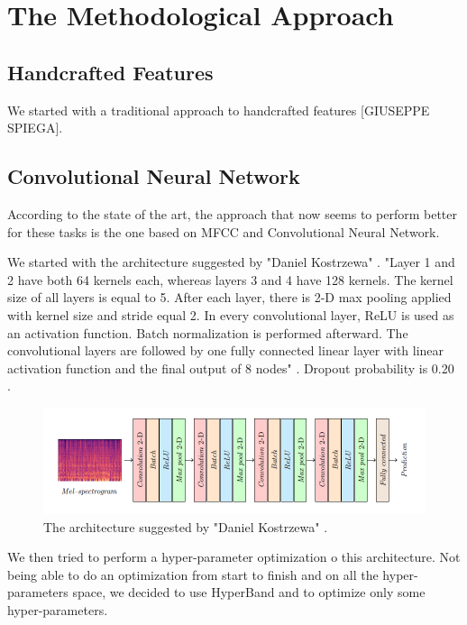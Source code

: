 \section{The Methodological Approach}

\subsection{Handcrafted Features}
We started with a traditional approach to handcrafted features [GIUSEPPE SPIEGA].

\subsection{Convolutional Neural Network}
According to the state of the art, the approach that now seems to perform better for these tasks is the one based on MFCC and Convolutional Neural Network. 

We started with the architecture suggested by "Daniel Kostrzewa" \cite{kostrzewa2021music}.
"Layer 1 and 2 have both 64 kernels each, whereas layers 3 and 4 have 128 kernels. The kernel size of all layers is equal to 5. After each layer, there is 2-D max pooling applied with kernel size and stride equal 2. In every convolutional layer, ReLU is used as an activation function. Batch normalization is performed afterward. The convolutional layers are followed by one fully connected linear layer with linear activation function and the final output of 8 nodes" \cite{kostrzewa2021music}. Dropout probability is 0.20 .

\begin{figure}[ht]
\centering
\includegraphics[scale=0.6]{images/CNN-architecture.png}
\caption{The architecture suggested by "Daniel Kostrzewa" \cite{kostrzewa2021music}.}
\label{fig:CNN-architecture}
\end{figure}

We then tried to perform a hyper-parameter optimization o this architecture.
Not being able to do an optimization from start to finish and on all the hyper-parameters space, we decided to use HyperBand and to optimize only some hyper-parameters.

